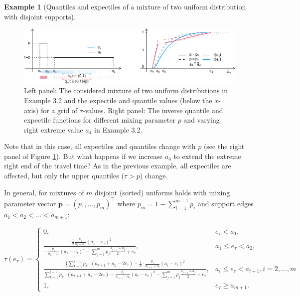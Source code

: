 \documentclass[preprint, 3p, authoryear]{elsarticle} %
\theoremstyle{definition}
\theoremstyle{definition}
\newtheorem{example}{Example}[section]
\theoremstyle{definition}
\theoremstyle{definition}
\theoremstyle{remark}
\begin{document}
\begin{example}[Quantiles and expectiles of a mixture of two uniform distribution with disjoint supports]
\begin{figure}
\includegraphics[width=1\linewidth]{traffic-expectiles_files/figure-latex/figexp1-1} \caption{Left panel: The considered mixture of two uniform distributions in Example 3.2 and the expectile and quantile values (below the $x$-axis) for a grid of $\tau$-values. Right panel: The inverse quantile and expectile functions for different mixing parameter $p$ and varying right extreme value $a_4$ in Example 3.2.}\label{fig:figexp1}
\end{figure}

Note that in this case, all expectiles and quantiles change with \(p\) (see the right panel of Figure \ref{fig:figexp1}). But what happens if we increase \(a_4\) to extend the extreme right end of the travel time? As in the previous example, all expectiles are affected, but only the upper quantiles (\(\tau>p\)) change.

In general, for mixtures of \(m\) disjoint (sorted) uniforms holds with mixing parameter vector \(\mathbf p=(p_1,\ldots,p_m)^\top\) where \(p_m=1-\sum_{i=1}^{m-1}p_i\) and support edges \(a_1<a_2<\ldots<a_{m+1}\):

\[\tau(e_\tau) = 
\begin{cases}
0,&e_\tau<a_1,\\
\frac{-\frac 12\frac{p_1}{a_2-a_1}(a_1-e_\tau)^2}  {-\frac{p_1}{a_2-a_1}(a_1-e_\tau)^2- \sum_{j=1}^mp_j\frac{a_{j+1}+a_j}2 +e_\tau} ,&a_1\leq e_\tau< a_2,\\
\frac{\frac 12\sum_{k=1}^{i-1}p_k\cdot (a_{k+1}+a_{k}-2e_\tau) -\frac 12 \cdot \frac{p_i}{a_{i+1}-a_i}(a_i-e_\tau)^2}  {\sum_{k=1}^{i-1}p_k\cdot (a_{k+1}+a_{k}-2e_\tau) -\frac{p_i}{a_{i+1}-a_i}(a_i-e_\tau)^2- \sum_{j=1}^mp_j\frac{a_{j+1}+a_j}2 +e_\tau} ,&a_i\leq e_\tau< a_{i+1},i=2,\ldots, m\\
1, &e_\tau\geq a_{m+1}.
\end{cases}\]
\end{example}
\end{document}
